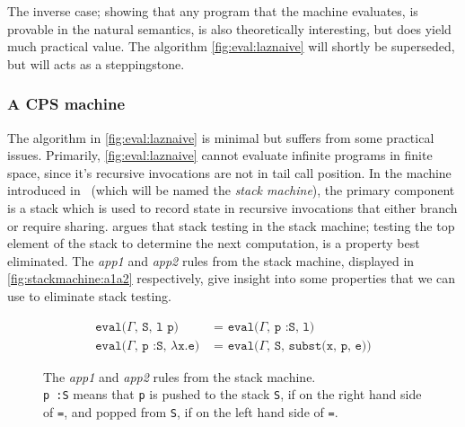 The inverse case; showing that any program that the machine evaluates, is provable in the natural semantics, is also theoretically interesting, but does yield much practical value.
The algorithm \autoref{fig:eval:laznaive} will shortly be superseded, but will acts as a steppingstone.

\subsubsection{A CPS machine}
The algorithm in \autoref{fig:eval:laznaive} is minimal but suffers from some practical issues.
Primarily, \autoref{fig:eval:laznaive} cannot evaluate infinite programs in finite space, since it's recursive invocations are not in tail call position.
In the machine introduced in~\cite{sestoft1997deriving} (which will be named the \textit{stack machine}), the primary component is a stack which is used to record state in recursive invocations that either branch or require sharing.
\cite{sestoft1997deriving} argues that stack testing in the stack machine; testing the top element of the stack to determine the next computation, is a property best eliminated.
The \textit{app1} and \textit{app2} rules from the stack machine, displayed in \autoref{fig:stackmachine:a1a2} respectively, give insight into some properties that we can use to eliminate stack testing.
\begin{figure}[p]
\begin{mdframed}
\begin{align}
  \texttt{eval($\Gamma$, S, l p) }&\texttt{= eval($\Gamma$, p :S, l)}\tag*{}\\
  \texttt{eval($\Gamma$, p :S, $\lambda$x.e) }&\texttt{= eval($\Gamma$, S, subst(x, p, e))}\tag*{}
\end{align}
\end{mdframed}
  \caption{The \textit{app1} and \textit{app2} rules from the stack machine.\\
  \texttt{p :S} means that \texttt{p} is pushed to the stack \texttt{S}, if on the right hand side of \texttt{=}, and popped from \texttt{S}, if on the left hand side of \texttt{=}.}
  \label{fig:stackmachine:a1a2}
\end{figure}

